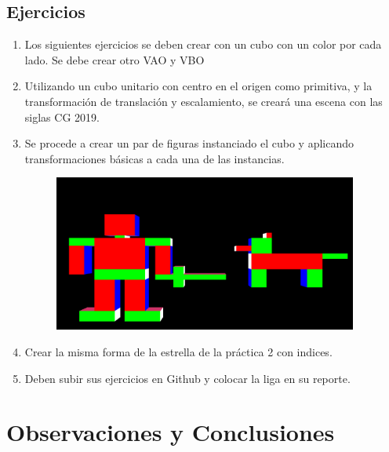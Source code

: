 \documentclass[11pt, english]{article}
\begin{document}
\subsection{Ejercicios}
\begin{enumerate}
\item Los siguientes ejercicios se deben crear con un cubo con un color por cada lado. Se debe crear otro VAO y VBO
\item Utilizando un cubo unitario con centro en el origen como primitiva, y la
transformación de translación y escalamiento, se creará una escena con las siglas CG 2019.

\item Se procede a crear un par de figuras instanciado el cubo y aplicando
transformaciones básicas a cada una de las instancias.
\begin{figure}[htb]
\begin{center}
\includegraphics[width=10cm]{images/Transformaciones.png}
\end{center}
\end{figure}
\item Crear la misma forma de la estrella de la práctica 2 con indices.
\item Deben subir sus ejercicios en Github y colocar la liga en su reporte.
\end{enumerate}
\section{Observaciones y Conclusiones}
\end{document}
